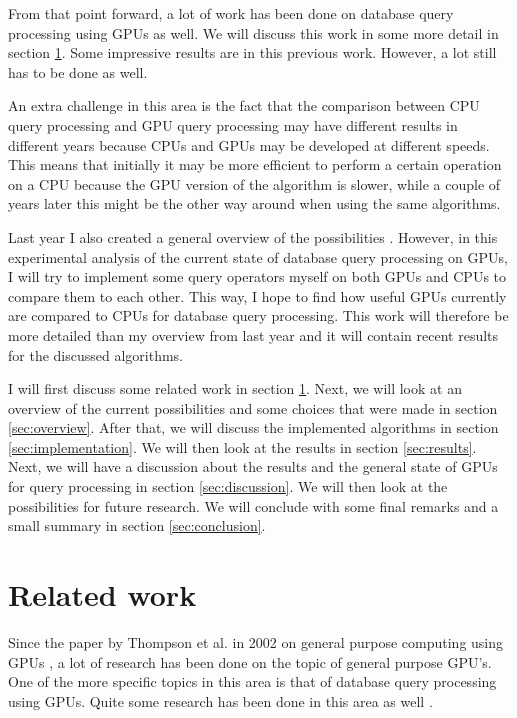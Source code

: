 \documentclass[a4paper,titlepage]{article}
\begin{document}
From that point forward, a lot of work has been done on database query processing using GPUs as well. We will discuss this work in some more detail in section \ref{sec:related-work}. Some impressive results are in this previous work. However, a lot still has to be done as well. 

An extra challenge in this area is the fact that the comparison between CPU query processing and GPU query processing may have different results in different years because CPUs and GPUs may be developed at different speeds. This means that initially it may be more efficient to perform a certain operation on a CPU because the GPU version of the algorithm is slower, while a couple of years later this might be the other way around when using the same algorithms.

Last year I also created a general overview of the possibilities \cite{kostjens2015}. However, in this experimental analysis of the current state of database query processing on GPUs, I will try to implement some query operators myself on both GPUs and CPUs to compare them to each other. This way, I hope to find how useful GPUs currently are compared to CPUs for database query processing. This work will therefore be more detailed than my overview from last year and it will contain recent results for the discussed algorithms.

I will first discuss some related work in section \ref{sec:related-work}. Next, we will look at an overview of the current possibilities and some choices that were made in section \ref{sec:overview}. After that, we will discuss the implemented algorithms in section \ref{sec:implementation}. We will then look at the results in section \ref{sec:results}. Next, we will have a discussion about the results and the general state of GPUs for query processing in section \ref{sec:discussion}. We will then look at the possibilities for future research. We will conclude with some final remarks and a small summary in section \ref{sec:conclusion}.

\section{Related work}
\label{sec:related-work}
Since the paper by Thompson et al. in 2002 on general purpose computing using GPUs \cite{thompson2002}, a lot of research has been done on the topic of general purpose GPU's. One of the more specific topics in this area is that of database query processing using GPUs. Quite some research has been done in this area as well \cite{bakkum2010,fang2007,kaldeway2010}. 
\end{document}
